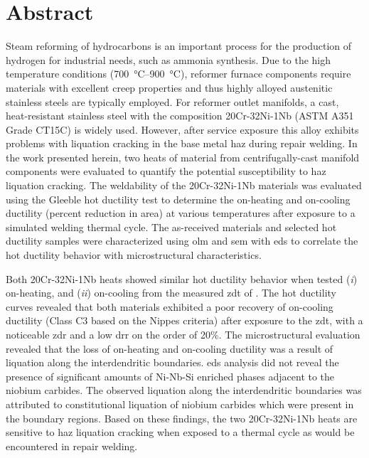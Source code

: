 \chapter*{Abstract}\label{ch:abstract}
Steam reforming of hydrocarbons is an important process for the production of hydrogen for industrial needs, such as ammonia synthesis. Due to the high temperature conditions (\SIrange[range-phrase=--]{700}{900}{\degreeCelsius}), reformer furnace components require materials with excellent creep properties and thus highly alloyed austenitic stainless steels are typically employed. For reformer outlet manifolds, a cast, heat-resistant stainless steel with the composition 20Cr-32Ni-1Nb (ASTM A351 Grade CT15C) is widely used. However, after service exposure this alloy exhibits problems with liquation cracking in the base metal \gls{haz} during repair welding. In the work presented herein, two heats of material from centrifugally-cast manifold components were evaluated to quantify the potential susceptibility to \gls{haz} liquation cracking. The weldability of the 20Cr-32Ni-1Nb materials was evaluated using the Gleeble\textregistered{} hot ductility test to determine the on-heating and on-cooling ductility (percent reduction in area) at various temperatures after exposure to a simulated welding thermal cycle. The as-received materials and selected hot ductility samples were characterized using \gls{olm} and \gls{sem} with \gls{eds} to correlate the hot ductility behavior with microstructural characteristics.

Both 20Cr-32Ni-1Nb heats showed similar hot ductility behavior when tested (\emph{i}) on-heating, and (\emph{ii}) on-cooling from the measured \gls{zdt} of . The hot ductility curves revealed that both materials exhibited a poor recovery of on-cooling ductility (Class C3 based on the Nippes criteria) after exposure to the \gls{zdt}, with a noticeable \gls{zdr} and a low \gls{drr} on the order of 20\%. The microstructural evaluation revealed that the loss of on-heating and on-cooling ductility was a result of liquation along the interdendritic boundaries. \gls{eds} analysis did not reveal the presence of significant amounts of Ni-Nb-Si enriched phases adjacent to the niobium carbides. The observed liquation along the interdendritic boundaries was attributed to constitutional liquation of niobium carbides which were present in the boundary regions. Based on these findings, the two 20Cr-32Ni-1Nb heats are sensitive to \gls{haz} liquation cracking when exposed to a thermal cycle as would be encountered in repair welding.




